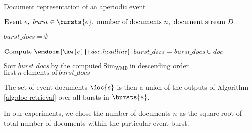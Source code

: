 \begin{algorithm}[H]
\begin{algorithmic}[1]
\caption{Document representation of an aperiodic event}
\label{alg:doc-retrieval}
\Input $\text{Event}\ e,\ \mathit{burst} \in \bursts{e},\ \text{number of documents}\ n,\ \text{document stream}\ D$

\State $\mathit{burst\_docs} = \emptyset$

		\State $\text{Compute}\ \wmdsim{\kw{e}}{\mathit{doc.headline}}$
		\State $\mathit{burst\_docs} = \mathit{burst\_docs} \cup \mathit{doc}$
	\EndIf
\EndFor

\State $\text{Sort}\ \mathit{burst\_docs}\ \text{by the computed}\ \text{Sim}_{\text{WMD}} \ \text{in descending order}$
\Output $\text{first}\ n\ \text{elements of}\ \mathit{burst\_docs}$
\end{algorithmic}
\end{algorithm}

The set of event documents $\doc{e}$ is then a union of the outputs of Algorithm \ref{alg:doc-retrieval} over all bursts in $\bursts{e}$.

In our experiments, we chose the number of documents $n$ as the square root of total number of documents within the particular event burst.